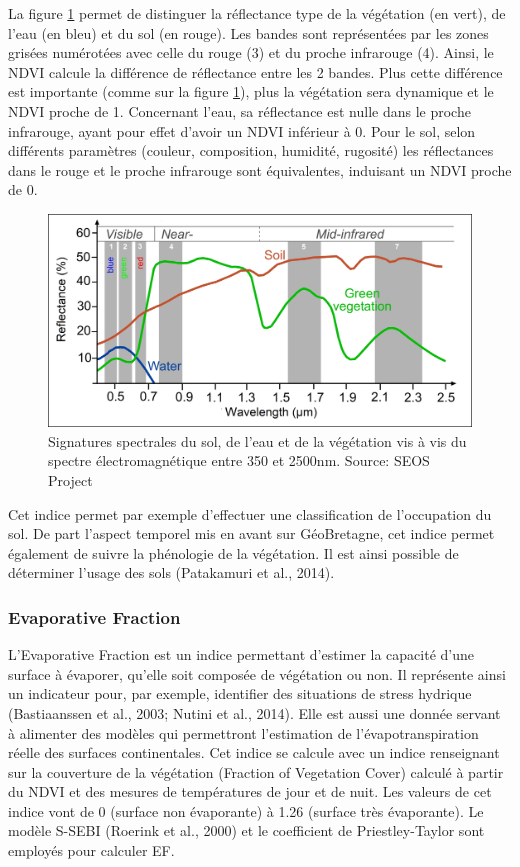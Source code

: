 \documentclass[10pt,a4paper]{article}
\begin{document}
La figure \ref{signSpectr} permet de distinguer la réflectance type de la végétation (en vert), de l'eau (en bleu) et du sol (en rouge). Les bandes sont représentées par les zones grisées numérotées avec celle du rouge (3) et du proche infrarouge (4). Ainsi, le NDVI calcule la différence de réflectance entre les 2 bandes. Plus cette différence est importante (comme sur la figure \ref{signSpectr}), plus la végétation sera dynamique et le NDVI proche de 1. Concernant l'eau, sa réflectance est nulle dans le proche infrarouge, ayant pour effet d'avoir un NDVI inférieur à 0. Pour le sol, selon différents paramètres (couleur, composition, humidité, rugosité) les réflectances dans le rouge et le proche infrarouge sont équivalentes, induisant un NDVI proche de 0.\smallbreak

\begin{figure}[!h]
\centering
\includegraphics[scale=0.4]{img/spectral_signatures.jpg}
\caption{Signatures spectrales du sol, de l'eau et de la végétation vis à vis du spectre électromagnétique entre 350 et 2500nm. Source: SEOS Project}
\label{signSpectr}
\end{figure}

Cet indice permet par exemple d'effectuer une classification de l'occupation du sol. De part l'aspect temporel mis en avant sur GéoBretagne, cet indice permet également de suivre la phénologie de la végétation. Il est ainsi possible de déterminer l'usage des sols (Patakamuri et al., 2014).

\subsubsection{Evaporative Fraction}

L'Evaporative Fraction est un indice permettant d'estimer la capacité d'une
surface à évaporer, qu’elle soit composée de végétation ou non. Il représente ainsi un indicateur pour, par exemple, identifier des situations de stress hydrique (Bastiaanssen et al., 2003; Nutini et al., 2014). Elle est aussi une donnée servant à alimenter des modèles qui permettront l’estimation de l'évapotranspiration réelle des surfaces continentales. Cet indice se calcule avec un indice renseignant sur la couverture de la végétation (Fraction of Vegetation Cover) calculé à partir du NDVI et des mesures de températures de jour et de nuit. Les valeurs de cet indice vont de 0 (surface non évaporante) à 1.26 (surface très évaporante). Le modèle S-SEBI (Roerink et al., 2000) et le coefficient de Priestley-Taylor sont employés pour calculer EF.\smallbreak
\end{document}
